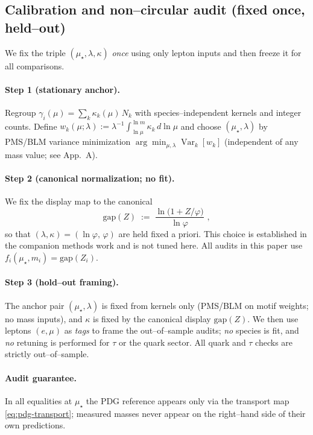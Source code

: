 \documentclass[epjc3]{svjour3}
\begin{document}
\subsection{Calibration and non–circular audit (fixed once, held–out)}
We fix the triple $(\mu_\star,\lambda,\kappa)$ \emph{once} using only lepton inputs and then freeze it for all comparisons.

\paragraph{Step 1 (stationary anchor).} Regroup $\gamma_i(\mu)=\sum_k \kappa_k(\mu)\,N_k$ with species–independent kernels and integer counts. Define $w_k(\mu;\lambda):=\lambda^{-1}\!\int_{\ln\mu}^{\ln m}\kappa_k\,d\ln\mu$ and choose $(\mu_\star,\lambda)$ by PMS/BLM variance minimization $\arg\min_{\mu,\lambda}\operatorname{Var}_k[w_k]$ (independent of any mass value; see App.~A).

\paragraph{Step 2 (canonical normalization; no fit).} We fix the display map to the canonical
\[
\mathrm{gap}(Z)\;:=\;\frac{\ln\!\bigl(1+Z/\varphi\bigr)}{\ln\varphi}\,\,,
\]
so that $(\lambda,\kappa)=(\ln\varphi,\,\varphi)$ are held fixed a priori. This choice is established in the companion methods work and is not tuned here. All audits in this paper use $f_i(\mu_\star,m_i)=\mathrm{gap}(Z_i)$.

\paragraph{Step 3 (hold–out framing).} The anchor pair $(\mu_\star,\lambda)$ is fixed from kernels only (PMS/BLM on motif weights; no mass inputs), and $\kappa$ is fixed by the canonical display $\mathrm{gap}(Z)$. We then use leptons $(e,\mu)$ as \emph{tags} to frame the out–of–sample audits; \emph{no} species is fit, and \emph{no} retuning is performed for $\tau$ or the quark sector. All quark and $\tau$ checks are strictly out–of–sample.

\paragraph{Audit guarantee.} In all equalities at $\mu_\star$ the PDG reference appears only via the transport map \eqref{eq:pdg-transport}; measured masses never appear on the right–hand side of their own predictions.
\end{document}
